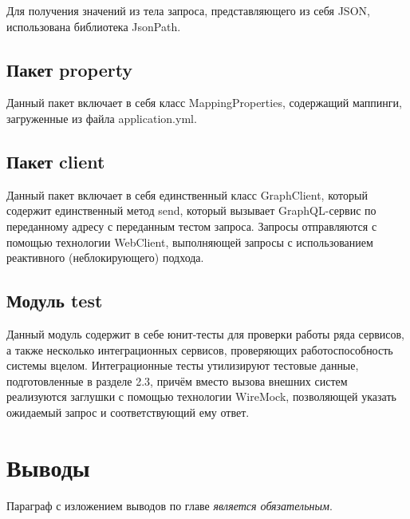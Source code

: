Для получения значений из тела запроса, представляющего из себя JSON, использована библиотека JsonPath.

\subsection{Пакет property}

Данный пакет включает в себя класс MappingProperties, содержащий маппинги, загруженные из файла application.yml.

\subsection{Пакет client}

Данный пакет включает в себя единственный класс GraphClient, который содержит единственный метод send, который вызывает GraphQL-сервис по переданному адресу с переданным тестом запроса.
Запросы отправляются с помощью технологии WebClient, выполняющей запросы с использованием реактивного (неблокирующего) подхода.

\subsection{Модуль test}

Данный модуль содержит в себе юнит-тесты для проверки работы ряда сервисов, а также несколько интеграционных сервисов, проверяющих работоспособность системы вцелом.
Интеграционные тесты утилизируют тестовые данные, подготовленные в разделе 2.3, причём вместо вызова внешних систем реализуются заглушки с помощью технологии WireMock, позволяющей указать ожидаемый запрос и соответствующий ему ответ.


\section{Выводы} \label{sec:ch3-conclusion}

Параграф с изложением выводов по главе \textit{является обязательным}.